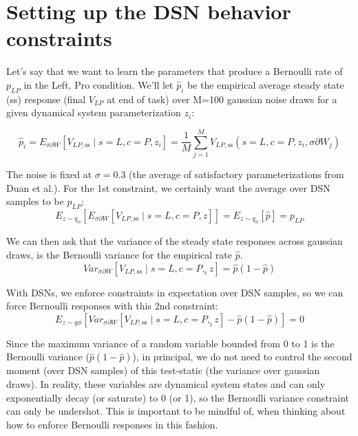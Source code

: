 \documentclass[11pt]{article}
\begin{document}
\section{Setting up the DSN behavior constraints}

Let's say that we want to learn the parameters that produce a Bernoulli rate of $p_{LP}$ in the Left, Pro condition.  We'll let $\hat{p}_i$ be the empirical average steady state (ss) response (final $V_{LP}$ at end of task) over M=100 gaussian noise draws for a given dynamical system parameterization $z_i$:

\begin{equation}
 \hat{p}_i = E_{\sigma \partial W} \left[ V_{LP,\text{ss}} \mid s=L, c=P, z_i \right] = \frac{1}{M}\sum_{j=1}^M V_{LP,\text{ss}}(s=L, c=P, z_i, \sigma \partial W_j)
 \end{equation}

The noise is fixed at $\sigma = 0.3$ (the average of satisfactory parameterizations from Duan et al.).  For the 1st constraint, we certainly want the average over DSN samples to be $p_{LP}$:
\begin{equation}
E_{z \sim q_\phi} \left[ E_{\sigma \partial W} \left[ V_{LP,\text{ss}} \mid s=L, c=P, z \right] \right] = E_{z \sim q_\phi} \left[ \hat{p} \right] = p_{LP}
\end{equation}

We can then ask that the variance of the steady state responses across gaussian draws, is the Bernoulli variance for the empirical rate $\hat{p}$.
\begin{equation}
 Var_{\sigma \partial W} \left[ V_{LP,\text{ss}} \mid s=L, c=P, _iz \right] = \hat{p}(1 - \hat{p})
\end{equation}

With DSNs, we enforce constraints in expectation over DSN samples, so we can force Bernoulli responses with this 2nd constraint:
\begin{equation}
E_{z \sim q\phi} \left[ Var_{\sigma \partial W} \left[ V_{LP,\text{ss}} \mid s=L, c=P, _iz \right] - \hat{p}(1 - \hat{p}) \right] = 0
\end{equation}

Since the maximum variance of a random variable bounded from 0 to 1 is the Bernoulli variance ($\hat{p}(1-\hat{p})$), in principal, we do not need to control the second moment (over DSN samples) of this test-static (the variance over gaussian draws).  In reality, these variables are dynamical system states and can only exponentially decay (or saturate) to 0 (or 1), so the Bernoulli variance constraint can only be undershot.  This is important to be mindful of, when thinking about how to enforce Bernoulli responses in this fashion.
\end{document}
